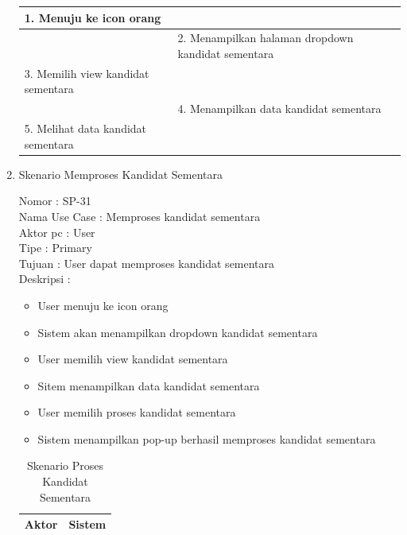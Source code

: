 \begin{enumerate}
\begin{table}
\begin{tabular}{ | l | p{66mm}|}
		1.	Menuju ke icon orang&  \\
		
		\hline
		
		&  2.	Menampilkan halaman  dropdown kandidat sementara \\
		
		\hline
		
		3. Memilih view kandidat sementara & \\
		
		\hline
		
		& 4. Menampilkan data kandidat sementara \\
		\hline
		
		5. Melihat data kandidat sementara & \\
		\hline
		
		
	\end{tabular}
\end{table}

\item Skenario Memproses Kandidat Sementara

Nomor \kern 3.6pc : SP-31 \\
Nama Use Case : Memproses kandidat sementara \\
Aktor  pc : User \\
Tipe \kern 4.6pc : Primary \\
Tujuan \kern 3.6pc : User dapat memproses kandidat sementara \\
Deskripsi \kern 2.5pc : 

\begin{itemize}
	\item User menuju ke icon orang
	\item Sistem akan menampilkan dropdown kandidat sementara
	\item User memilih view kandidat sementara
	\item Sitem menampilkan data kandidat sementara
	\item User memilih proses kandidat sementara
	\item Sistem menampilkan pop-up berhasil memproses kandidat sementara
	
\end{itemize}

\begin{table}
	\caption{Skenario Proses Kandidat Sementara}
	\centering
	\begin{tabular}{ | l | p{64mm}|}
		\hline 
		\textbf{Aktor} & \textbf{Sistem} \\
		\hline
		

\end{tabular}
\end{table}
\end{enumerate}
